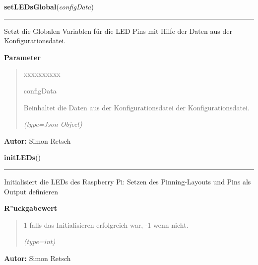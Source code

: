 \hspace{.8\funcindent}\begin{boxedminipage}{\funcwidth}

    \raggedright \textbf{setLEDsGlobal}(\textit{configData})

    \vspace{-1.5ex}

    \rule{\textwidth}{0.5\fboxrule}
\setlength{\parskip}{2ex}
    Setzt die Globalen Variablen für die LED Pins mit Hilfe der Daten aus 
    der Konfigurationsdatei.

\setlength{\parskip}{1ex}
      \textbf{Parameter}
      \vspace{-1ex}

      \begin{quote}
        \begin{Ventry}{xxxxxxxxxx}

          \item[configData]

          Beinhaltet die Daten aus der Konfigurationsdatei der 
          Konfigurationsdatei.

            {\it (type=Json Object)}

        \end{Ventry}

      \end{quote}

\textbf{Autor:} Simon Retsch



    \end{boxedminipage}

    \label{ledleuchtturm:ledFunc:initLEDs}

    \vspace{0.5ex}

\hspace{.8\funcindent}\begin{boxedminipage}{\funcwidth}

    \raggedright \textbf{initLEDs}()

    \vspace{-1.5ex}

    \rule{\textwidth}{0.5\fboxrule}
\setlength{\parskip}{2ex}
    Initialisiert die LEDs des Raspberry Pi: Setzen des Pinning-Layouts und
    Pins als Output definieren

\setlength{\parskip}{1ex}
      \textbf{R"uckgabewert}
    \vspace{-1ex}

      \begin{quote}
      1 falls das Initialisieren erfolgreich war, -1 wenn nicht.

      {\it (type=int)}

      \end{quote}

\textbf{Autor:} Simon Retsch



    \end{boxedminipage}


